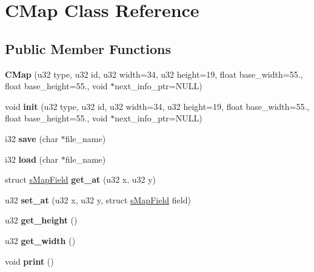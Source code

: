 \hypertarget{classCMap}{\section{C\-Map Class Reference}
\label{classCMap}
}
\subsection*{Public Member Functions}
\begin{DoxyCompactItemize}
\item 
\hypertarget{classCMap_a4c876418fc17ae4305050f694606da19}{{\bfseries C\-Map} (u32 type, u32 id, u32 width=34, u32 height=19, float base\-\_\-width=55., float base\-\_\-height=55., void $\ast$next\-\_\-info\-\_\-ptr=N\-U\-L\-L)}\label{classCMap_a4c876418fc17ae4305050f694606da19}

\item 
\hypertarget{classCMap_a3b28d9efc48cd3aaaedbcf6b8a4ee08b}{void {\bfseries init} (u32 type, u32 id, u32 width=34, u32 height=19, float base\-\_\-width=55., float base\-\_\-height=55., void $\ast$next\-\_\-info\-\_\-ptr=N\-U\-L\-L)}\label{classCMap_a3b28d9efc48cd3aaaedbcf6b8a4ee08b}

\item 
\hypertarget{classCMap_a2c63ef7566f912e5f65810cc49494d63}{i32 {\bfseries save} (char $\ast$file\-\_\-name)}\label{classCMap_a2c63ef7566f912e5f65810cc49494d63}

\item 
\hypertarget{classCMap_a429e21ab65933ff0f7a37ae1af0a5b0d}{i32 {\bfseries load} (char $\ast$file\-\_\-name)}\label{classCMap_a429e21ab65933ff0f7a37ae1af0a5b0d}

\item 
\hypertarget{classCMap_a36df674c5ef405df4fd43b90fdaedc5e}{struct \hyperlink{structsMapField}{s\-Map\-Field} {\bfseries get\-\_\-at} (u32 x, u32 y)}\label{classCMap_a36df674c5ef405df4fd43b90fdaedc5e}

\item 
\hypertarget{classCMap_ae0a92d92f2dfbb59cee71f3e36c64ede}{u32 {\bfseries set\-\_\-at} (u32 x, u32 y, struct \hyperlink{structsMapField}{s\-Map\-Field} field)}\label{classCMap_ae0a92d92f2dfbb59cee71f3e36c64ede}

\item 
\hypertarget{classCMap_a61d46ebb50e71cfb27538c6a535676e2}{u32 {\bfseries get\-\_\-height} ()}\label{classCMap_a61d46ebb50e71cfb27538c6a535676e2}

\item 
\hypertarget{classCMap_a3fa73723bc602608dc9109fa72e7d4ea}{u32 {\bfseries get\-\_\-width} ()}\label{classCMap_a3fa73723bc602608dc9109fa72e7d4ea}

\item 
\hypertarget{classCMap_a3c35084de796cf3008f184f08cc23429}{void {\bfseries print} ()}\label{classCMap_a3c35084de796cf3008f184f08cc23429}

\end{DoxyCompactItemize}


